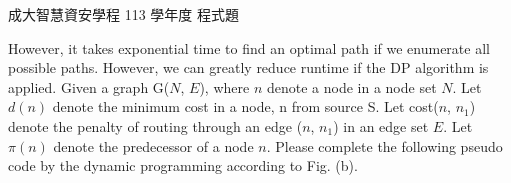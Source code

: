 \begin{pastexam}[label={px:ncku-113-isec-19}]{成大智慧資安學程 113 學年度 程式題}
\begin{enumerate}[label=\alph*.]
However, it takes exponential time to find an optimal path if we enumerate all possible paths.
However, we can greatly reduce runtime if the DP algorithm is applied. Given a graph G($N$, $E$),
where $n$ denote a node in a node set $N$. Let $d(n)$ denote the minimum cost in a node, n from
source S. Let cost($n$, $n_1$) denote the penalty of routing through an edge ($n$, $n_1$) in an
edge set $E$. Let $\pi(n)$ denote the predecessor of a node $n$. Please complete the following
pseudo code by the dynamic programming according to Fig. (b).

\begin{center}
\small
{}
\end{center}
\end{enumerate}
\end{pastexam}

